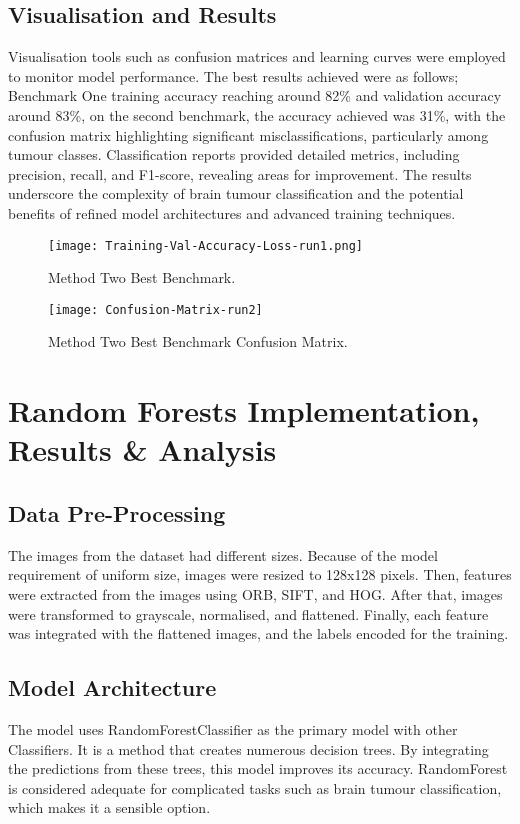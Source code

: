 \documentclass[conference]{IEEEtran}
\begin{document}
\subsection{Visualisation and Results}
Visualisation tools such as confusion matrices and learning curves were employed to monitor model performance. The best results achieved were as follows; Benchmark One training accuracy reaching around 82\% and validation accuracy around 83\%, on the second benchmark, the accuracy achieved was 31\%, with the confusion matrix highlighting significant misclassifications, particularly among tumour classes. Classification reports provided detailed metrics, including precision, recall, and F1-score, revealing areas for improvement. The results underscore the complexity of brain tumour classification and the potential benefits of refined model architectures and advanced training techniques.

\begin{figure}[htbp]
\centerline{\texttt{[image: Training-Val-Accuracy-Loss-run1.png]}}
\caption{Method Two Best Benchmark.}
\label{fig}
\end{figure}

\begin{figure}[htbp]
    \centerline{\texttt{[image: Confusion-Matrix-run2]}}
    \caption{Method Two Best Benchmark Confusion Matrix.}
    \label{fig}
\end{figure}

\section{Random Forests Implementation, Results \& Analysis}

\subsection{Data Pre-Processing}
The images from the dataset had different sizes. Because of the model requirement of uniform size, images were resized to 128x128 pixels. Then, features were extracted from the images using ORB, SIFT, and HOG. After that, images were transformed to grayscale, normalised, and flattened. Finally, each feature was integrated with the flattened images, and the labels encoded for the training.

\subsection{Model Architecture}
The model uses RandomForestClassifier as the primary model with other Classifiers. It is a method that creates numerous decision trees. By integrating the predictions from these trees, this model improves its accuracy. RandomForest is considered adequate for complicated tasks such as brain tumour classification, which makes it a sensible option.
\end{document}
